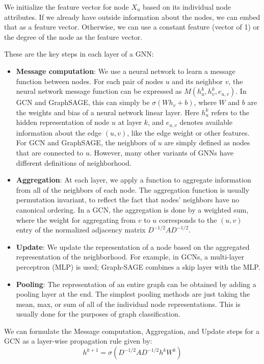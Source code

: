 \documentclass{article}
\numberwithin{figure}{section}
\begin{document}
We initialize the feature vector for node $X_u$ based on its individual node attributes. If we already have outside information about the nodes, we can embed that as a feature vector. Otherwise, we can use a constant feature (vector of 1) or the degree of the node as the feature vector.

These are the key steps in each layer of a GNN:
\begin{itemize}
    \item \textbf{Message computation}: We use a neural network to learn a message function between nodes. For each pair of nodes $u$ and its neighbor $v$, the neural network message function can be expressed as $M(h^k_u,h^k_v,e_{u,v})$. In GCN and GraphSAGE, this can simply be $\sigma(W h_v + b)$, where $W$ and $b$ are the weights and bias of a neural network linear layer. Here $h^k_u$ refers to the hidden representation of node $u$ at layer $k$, and $e_{u,v}$ denotes available information about the edge $(u, v)$, like the edge weight or other features. For GCN and GraphSAGE, the neighbors of $u$ are simply defined as nodes that are connected to $u$. However, many other variants of GNNs have different definitions of neighborhood.
    \item \textbf{Aggregation}: At each layer, we apply a function to aggregate information from all of the neighbors of each node. The aggregation function is usually permutation invariant, to reflect the fact that nodes’ neighbors have no canonical ordering. In a GCN, the aggregation is done by a weighted sum, where the weight for aggregating from $v$ to $u$ corresponds to the $(u,v)$ entry of the normalized adjacency matrix $D^{-1/2}AD^{-1/2}$.
    \item \textbf{Update}: We update the representation of a node based on the aggregated representation of the neighborhood. For example, in GCNs, a multi-layer perceptron (MLP) is used; Graph-SAGE combines a skip layer with the MLP.
    \item \textbf{Pooling}: The representation of an entire graph can be obtained by adding a pooling layer at the end. The simplest pooling methods are just taking the mean, max, or sum of all of the individual node representations. This is usually done for the purposes of graph classification.
\end{itemize}

We can formulate the Message computation, Aggregation, and Update steps for a GCN as a layer-wise propagation rule given by:
\begin{equation}
    h^{k+1} = \sigma(D^{-1/2} A D^{-1/2} h^k W^k)
\end{equation}
\end{document}
